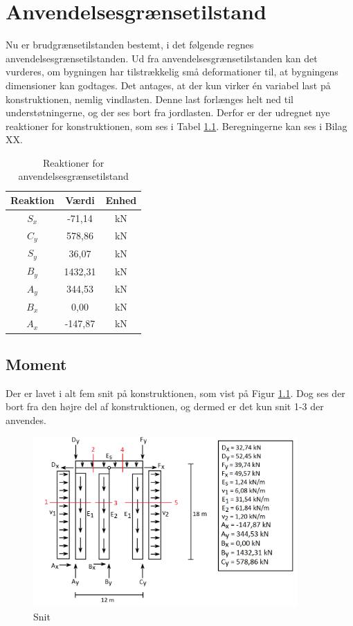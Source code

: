 \chapter{Anvendelsesgrænsetilstand}
Nu er brudgrænsetilstanden bestemt, i det følgende regnes anvendelsesgrænsetilstanden. Ud fra anvendelsesgrænsetilstanden kan det vurderes, om bygningen har tilstrækkelig små deformationer til, at bygningens dimensioner kan godtages. 
\newline \indent{     }  Det antages, at der kun virker én variabel last på konstruktionen, nemlig vindlasten. Denne last forlænges helt ned til understøtningerne, og der ses bort fra jordlasten. Derfor er der udregnet nye reaktioner for konstruktionen, som ses i Tabel \ref{tab:anden}. Beregningerne kan ses i Bilag XX. 

\begin{table}
	\begin{center}
		\begin{tabular}{|c|c|c|}
			\hline
			Reaktion & Værdi & Enhed \\ \hline
			$S_x$ & -71,14 		& kN      \\ \hline
			$C_y$ & 578,86 		& kN      \\ \hline
			$S_y$ & 36,07 		& kN       \\ \hline
			$B_y$ & 1432,31 	& kN      \\ \hline
			$A_y$ & 344,53 		& kN      \\ \hline
			$B_x$ & 0,00 		& kN      \\ \hline
			$A_x$ & -147,87 	& kN       \\ \hline
		\end{tabular}
		\caption{Reaktioner for anvendelsesgrænsetilstand}
		\label{tab:anden}
	\end{center}
\end{table}

\section{Moment}
Der er lavet i alt fem snit på konstruktionen, som vist på Figur \ref{fig:snitanvendelse}. Dog ses der bort fra den højre del af konstruktionen, og dermed er det kun snit 1-3 der anvendes. 

\begin{figure}[H]
	\centering
	\includegraphics[width=0.9\textwidth]{billeder/snitanvendelse.png}
	\caption{Snit}
	\label{fig:snitanvendelse}
\end{figure}

